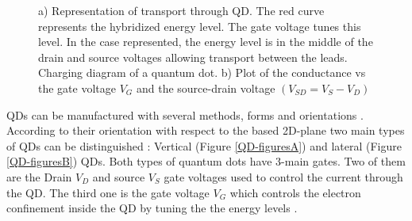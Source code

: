 \begin{figure}[t]
     \centering
    
     \caption{ a) Representation of transport through QD. The red curve represents the hybridized energy level. The gate voltage tunes this level. In the case represented, the energy level is in the middle of the drain and source voltages allowing transport between the leads.   Charging diagram of a quantum dot. b) Plot of the conductance vs the gate voltage $V_G$ and the source-drain voltage $(V_{SD}=V_{S}-V_{D} )$ \protect{}}
\end{figure}

 QDs can be manufactured with several methods, forms and orientations \citep{bimberg_quantum_1999}.
  According to their orientation with respect to the based 2D-plane  two main types of QDs can be distinguished : Vertical (Figure \ref{QD-figuresA}) and lateral (Figure \ref{QD-figuresB}) QDs. Both types  of quantum dots have $3$-main gates. Two of them are the Drain $V_D$ and source $V_S$ gate voltages used to control the current through the QD. The third one is the gate voltage $V_G$ which controls the electron confinement  inside the QD by tuning the  the energy levels . 

